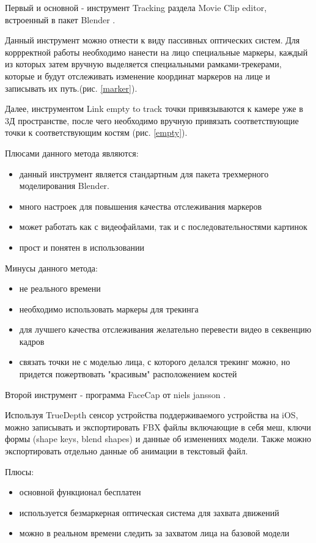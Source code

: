 Первый и основной - инструмент Tracking раздела Movie Clip editor, встроенный в пакет Blender \cite{cgmatter-ytb}.

Данный инструмент можно отнести к виду пассивных оптических систем. Для коррректной работы необходимо нанести на лицо специальные маркеры, каждый из которых затем вручную выделяется специальными рамками-трекерами, которые и будут отслеживать изменение координат маркеров на лице и записывать их путь.(рис. \ref{marker}).

Далее, инструментом Link empty to track точки привязываются к камере уже в 3Д пространстве, после чего необходимо вручную привязать соответствующие точки к соответствующим костям (рис. \ref{empty}).

Плюсами данного метода являются:
\begin{itemize}
	\item данный инструмент является стандартным для пакета трехмерного моделирования Blender.
	\item много настроек для повышения качества отслеживания маркеров
	\item может работать как с видеофайлами, так и с последовательностями картинок
	\item прост и понятен в использовании
\end{itemize}
Минусы данного метода:
\begin{itemize}
	\item не реального времени
	\item необходимо использовать маркеры для трекинга
	\item для лучшего качества отслеживания желательно перевести видео в секвенцию кадров
	\item связать точки не с моделью лица, с которого делался трекинг можно, но придется пожертвовать "красивым" расположением костей
\end{itemize}

Второй инструмент - программа FaceCap от niels jansson \cite{facecap}. 

Используя TrueDepth сенсор устройства поддерживаемого устройства на iOS, можно записывать и экспортировать FBX файлы включающие в себя меш, ключи формы (shape keys, blend shapes) и данные об изменениях модели. Также можно экспортировать отдельно данные об анимации в текстовый файл.

Плюсы:
\begin{itemize}
	\item основной функционал бесплатен
	\item используется безмаркерная оптическая система для захвата движений
	\item можно в реальном времени следить за захватом лица на базовой модели
\end{itemize}

